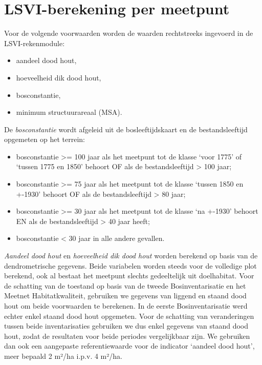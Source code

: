 \documentclass[twoside]{extreport}
\begin{document}
\needspace{60mm}

\section{LSVI-berekening per
meetpunt}\label{lsvi-berekening-per-meetpunt-2}

Voor de volgende voorwaarden worden de waarden rechtstreeks ingevoerd in
de LSVI-rekenmodule:

\begin{itemize}
\tightlist
\item
  aandeel dood hout,
\item
  hoeveelheid dik dood hout,
\item
  bosconstantie,
\item
  minimum structuurareaal (MSA).
\end{itemize}

\needspace{60mm} De \emph{bosconstantie} wordt afgeleid uit de
bosleeftijdskaart en de bestandsleeftijd opgemeten op het terrein:

\begin{itemize}
\tightlist
\item
  bosconstantie \textgreater{}= 100 jaar als het meetpunt tot de klasse
  `voor 1775' of `tussen 1775 en 1850' behoort OF als de
  bestandsleeftijd \textgreater{} 100 jaar;
\item
  bosconstantie \textgreater{}= 75 jaar als het meetpunt tot de klasse
  `tussen 1850 en +-1930' behoort OF als de bestandsleeftijd
  \textgreater{} 80 jaar;
\item
  bosconstantie \textgreater{}= 30 jaar als het meetpunt tot de klasse
  `na +-1930' behoort EN als de bestandsleeftijd \textgreater{} 40 jaar
  heeft;
\item
  bosconstantie \textless{} 30 jaar in alle andere gevallen.
\end{itemize}

\emph{Aandeel dood hout} en \emph{hoeveelheid dik dood hout} worden
berekend op basis van de dendrometrische gegevens. Beide variabelen
worden steeds voor de volledige plot berekend, ook al bestaat het
meetpunt slechts gedeeltelijk uit doelhabitat. Voor de schatting van de
toestand op basis van de tweede Bosinventarisatie en het Meetnet
Habitatkwaliteit, gebruiken we gegevens van liggend en staand dood hout
om beide voorwaarden te berekenen. In de eerste Bosinventarisatie werd
echter enkel staand dood hout opgemeten. Voor de schatting van
veranderingen tussen beide inventarisaties gebruiken we dus enkel
gegevens van staand dood hout, zodat de resultaten voor beide periodes
vergelijkbaar zijn. We gebruiken dan ook een aangepaste referentiewaarde
voor de indicator `aandeel dood hout', meer bepaald 2 m²/ha i.p.v. 4
m²/ha.
\end{document}
